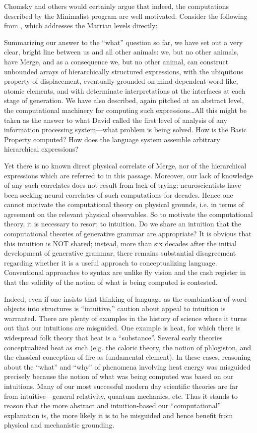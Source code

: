   Chomsky and others would certainly argue that indeed, the computations described by the Minimalist program are well motivated. Consider the following from \citet{BerwickChomksy2016}, which addresses the Marrian levels directly:

Summarizing our answer to the “what” question so far, we have set out a very clear, bright line between us and all other animals: we, but no other animals, have Merge, and as a consequence we, but no other animal, can construct unbounded arrays of hierarchically structured expressions, with the ubiquitous property of displacement, eventually grounded on mind-dependent word-like, atomic elements, and with determinate interpretations at the interfaces at each stage of generation. We have also described, again pitched at an abstract level, the computational machinery for computing such expressions…All this might be taken as the answer to what David \citet{Marr1982} called the first level of analysis of any information processing system—what problem is being solved. How is the Basic Property computed? How does the language system assemble arbitrary hierarchical expressions?

Yet there is no known direct physical correlate of Merge, nor of the hierarchical expressions which are referred to in this passage. Moreover, our lack of knowledge of any such correlates does not result from lack of trying: neuroscientists have been seeking neural correlates of such computations for decades. Hence one cannot motivate the computational theory on physical grounds, i.e. in terms of agreement on the relevant physical observables. So to motivate the computational theory, it is necessary to resort to intuition. Do we share an intuition that the computational theories of generative grammar are appropriate? It is obvious that this intuition is NOT shared; instead, more than six decades after the initial development of generative grammar, there remains substantial disagreement regarding whether it is a useful approach to conceptualizing language. Conventional approaches to syntax are unlike fly vision and the cash register in that the validity of the notion of what is being computed is contested.

Indeed, even if one insists that thinking of language as the combination of word-objects into structures is “intuitive,” caution about appeal to intuition is warranted. There are plenty of examples in the history of science where it turns out that our intuitions are misguided. One example is heat, for which there is widespread folk theory that heat is a “substance”. Several early theories conceptualized heat as such (e.g. the caloric theory, the notion of phlogiston, and the classical conception of fire as fundamental element). In these cases, reasoning about the “what” and “why” of phenomena involving heat energy was misguided precisely because the notion of what was being computed was based on our intuitions. Many of our most successful modern day scientific theories are far from intuitive—general relativity, quantum mechanics, etc. Thus it stands to reason that the more abstract and intuition-based our “computational” explanation is, the more likely it is to be misguided and hence benefit from physical and mechanistic grounding.

